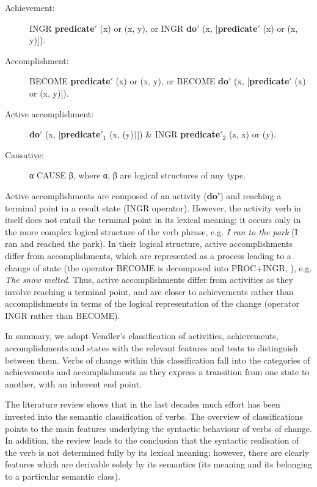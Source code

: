 \documentclass[output=paper,colorlinks,citecolor=brown]{langscibook}
\begin{document}
\begin{description}
\sloppy
\item [Achievement:] INGR \textbf{predicate$\prime$} (x) or (x, y), or INGR \textbf{do$\prime$} (x, [\textbf{predicate$\prime$} (x) or (x, y)]).

\item [Accomplishment:] BECOME \textbf{predicate$\prime$} (x) or (x, y), or BECOME \textbf{do$\prime$} (x, [\textbf{predicate$\prime$} (x) or (x, y)]).

\item [Active accomplishment:] \textbf{do$\prime$} (x, [\textbf{predicate$\prime$$_1$}  (x, (y))]) \& INGR \textbf{predicate$\prime$}$_2$  (z, x) or (y).

\item [Causative:] α CAUSE β, where α, β are logical structures of any type.
\end{description}

Active accomplishments are composed of an activity (\textbf{do’}) and reaching a terminal point in a result state (INGR operator). However, the activity verb in itself does not entail the terminal point in its lexical meaning; it occurs only in the more complex logical structure of the verb phrase, e.g. \textit{I ran to the park} (I ran and reached the park). In their logical structure, active accomplishments differ from accomplishments, which are represented as a process leading to a change of state (the operator BECOME is decomposed into PROC+INGR, \cite[44]{VanValin2005}), e.g. \textit{The snow melted}. Thus, active accomplishments differ from activities as they involve reaching a terminal point, and are closer to achievements rather than accomplishments in terms of the logical representation of the change (operator INGR rather than BECOME).


In summary, we adopt Vendler’s classification of activities, achievements, accomplishments and states with the relevant features and tests to distinguish between them. Verbs of change within this classification fall into the categories of achievements and accomplishments as they express a transition from one state to another, with an inherent end point.

The literature review shows that in the last decades much effort has been invested into the semantic classification of verbs. The overview of classifications points to the main features underlying the syntactic behaviour of verbs of change. In addition, the review leads to the conclusion that the syntactic realisation of the verb is not determined fully by its lexical meaning; however, there are clearly features which are derivable solely by its semantics (its meaning and its belonging to a particular semantic class).
\end{document}
